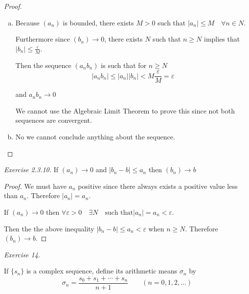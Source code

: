 \documentclass{tufte-book}
\theoremstyle{definition}
\numberwithin{section}{chapter}
\begin{document}
\begin{proof}

\begin{enumerate}[(a)]
	\item   Because $(a_n)$ is bounded, there exists $M > 0$ such that $|a_n| \leq M \quad \forall n \in N$.
	
	Furthermore since $(b_n) \to 0$, there exists $N$ such that $n \geq N$ implies that $|b_n| \leq \frac{\varepsilon}{M}$.
	
	Then the sequence $(a_n b_n) $ is such that for $n \geq N$
	$$ |a_n b_n | \leq |a_n| |b_n| < M \frac{\varepsilon}{M} = \varepsilon $$
	
	
	and $a_n b_n  \to 0$
	
	
	We cannot use the Algebraic Limit Theorem to prove this since not both sequences are convergent.
	
	
	

\item No we cannot conclude anything about the sequence. 
\end{enumerate}
\end{proof}

\noindent
\emph{Exercise 2.3.10.}
If $(a_n) \to 0$ and $|b_n - b| \leq a_n$ then $(b_n) \to b$

\begin{proof}
	We must have $a_n$ positive since there always exists a positive value less than $a_n$.  Therefore $|a_n| = a_n$.
	
	If $(a_n) \to 0$ then $\forall \varepsilon > 0 \quad \exists N \quad \text{such that} |a_n | = a_n < \varepsilon$.
	
	Then the the above inequality $|b_n - b| \leq a_n < \varepsilon$ when $n \geq N$.   Therefore $(b_n) \to b$.
\end{proof}


\noindent
\emph{Exercise 14.}

  If $\{s_{n}\}$ is a complex sequence, define its arithmetic means $\sigma_{n}$ by
 $$  \sigma_{n} = \frac{s_{0} + s_{1} + \cdots + s_{n}}{n+1} \qquad (n=0,1,2,\ldots) $$
 
\end{document}
